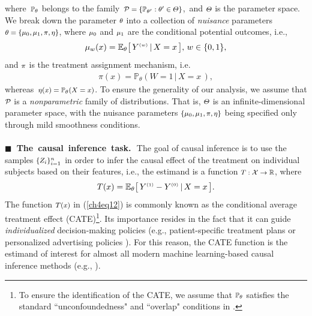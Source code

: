\documentclass [PhD] {uclathes}
\begin{document}
where~$\mbox{\footnotesize $\mathbb{P}_{\theta}$}$ belongs to the family~$\mbox{\footnotesize $\mathcal{P} = \{\mathbb{P}_{\theta^{\prime}}: \theta^{\prime} \in \Theta\}$}$,~and $\mbox{\footnotesize $\Theta$}$ is the parameter space. We break down the parameter $\mbox{\footnotesize $\theta$}$ into a collection of {\it nuisance} parameters $\mbox{\footnotesize $\theta = \{\mu_0,\mu_1,\pi,\eta\}$}$, where $\mbox{\footnotesize $\mu_0$}$ and $\mbox{\footnotesize $\mu_1$}$ are the conditional potential outcomes, i.e., 
\begin{align}
\mu_{w}(x) = \mathbb{E}_{\theta}\big[\, Y^{\mbox{\tiny $(w)$}}\,|\,X = x\,\big],\, w \in \{0,1\},
\label{ch4eq10}
\end{align} 
and $\mbox{\footnotesize $\pi$}$ is the treatment assignment mechanism, i.e.
\begin{align}
\pi(x) = \mathbb{P}_{\theta}(W = 1\,|\,X = x\,), 
\label{ch4eq11}
\end{align}
whereas~$\mbox{\footnotesize $\eta(x) = \mathbb{P}_{\theta}(X=x)$}$. To ensure the generality of our analysis, we assume that $\mbox{\footnotesize $\mathcal{P}$}$ is a {\it nonparametric} family of distributions. That is, $\mbox{\footnotesize $\Theta$}$ is an infinite-dimensional parameter space, with the nuisance parameters $\mbox{\footnotesize $\{\mu_0,\mu_1,\pi,\eta\}$}$ being specified only through mild smoothness conditions.\\
\\
{\bf \mbox{\tiny $\blacksquare$}~The~causal~inference~task.}\,~The goal of causal inference is to use the samples $\mbox{\footnotesize $\{Z_i\}^n_{i=1}$}$ in order to infer the causal effect of the treatment on individual subjects based on their features, i.e., the estimand is a function $\mbox{\footnotesize $T:\mathcal{X} \rightarrow \mathbb{R}$}$, where 
\begin{align}
T(x) = \mathbb{E}_{\theta}\big[\, Y^{\mbox{\tiny $(1)$}}-Y^{\mbox{\tiny $(0)$}}\,|\,X = x\,\big].
\label{ch4eq12}
\end{align}
The function $\mbox{\footnotesize $T(x)$}$ in (\ref{ch4eq12}) is commonly known as the conditional average treatment effect (CATE)\footnote{To ensure the identification of the CATE, we assume that $\mbox{\footnotesize $\mathbb{P}_{\theta}$}$ satisfies the standard ``unconfoundedness" and ``overlap" conditions in \cite{pearl2009causality,rubin2005causal}.}. Its importance resides in the fact that it can guide {\it individualized} decision-making policies (e.g., patient-specific treatment plans or personalized advertising policies \cite{bottou2013counterfactual}). For this reason, the CATE function is the estimand of interest for almost all modern machine learning-based causal inference methods (e.g., \cite{alaa2018limits,wager2017estimation,jjschaar,yao2018representation}).\\ 
\end{document}
